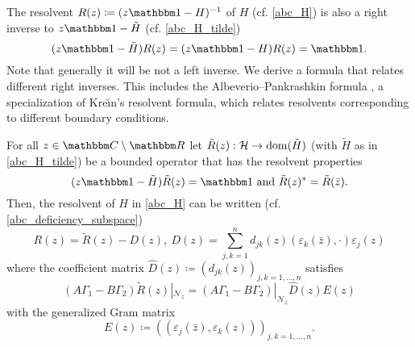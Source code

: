 The resolvent $R(z)\coloneqq(z\id-H)^{-1}$ of $H$ (cf. \eqref{abc_H}) is also a right inverse to $z\id-\tilde H$ (cf. \eqref{abc_H_tilde})
\begin{equation}\label{abc_right_inverse}
  (z\id-\tilde H)R(z) = (z\id - H)R(z) = \id .
\end{equation}
Note that generally it will be not a left inverse. We derive a formula that relates different right inverses.
This includes the Albeverio--Pankrashkin formula \cite{AlbeverioPankrashkin2005}, a specialization of
Kre\u\i{}n's resolvent formula, which relates resolvents corresponding to
different boundary conditions.

\begin{proposition}\label{abc02t}
For all $z\in\C\setminus\R$ let $\tilde R(z):{\mathcal H}\to\operatorname{dom}(\tilde H)$ (with $\tilde H$ as in \eqref{abc_H_tilde}) 
be a bounded operator that has the resolvent properties
\begin{equation}\label{abc02t01}
  (z\id-\tilde H)\tilde R(z)=\id\ \text{and}\ \tilde R(z)^* = \tilde R(\bar z) .
\end{equation}
Then, the resolvent of $H$ in \eqref{abc_H} can be written (cf. \eqref{abc_deficiency_subspace})
\begin{equation}\label{abc02t02}
  R(z) = \tilde R(z) - D(z),\
  D(z) = \sum_{j,k=1}^n d_{jk}(z) (\varepsilon_k(\bar z),\cdot)\varepsilon_j(z)
\end{equation}
where the coefficient matrix $\hat D(z)\coloneqq(d_{jk}(z))_{j,k=1,\ldots,n}$ satisfies
\begin{equation}\label{abc02t03}
  (A\Gamma_1-B\Gamma_2)\tilde R(z)|_{\mathcal{N}_z} = (A\Gamma_1-B\Gamma_2)|_{\mathcal{N}_z} \hat D(z) E(z)
\end{equation}
with the generalized Gram matrix
\begin{equation}\label{abc02t04}
  E(z) \coloneqq ( (\varepsilon_j(\bar z), \varepsilon_k(z)) )_{j,k=1,\ldots,n} .
\end{equation}
\end{proposition}
